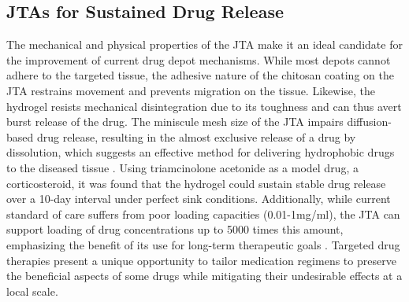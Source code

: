 \subsection{JTAs for Sustained Drug Release}
The mechanical and physical properties of the JTA make it an ideal candidate for the improvement of current drug depot mechanisms. While most depots cannot adhere to the targeted tissue, the adhesive nature of the chitosan coating on the JTA restrains movement and prevents migration on the tissue. Likewise, the hydrogel resists mechanical disintegration due to its toughness and can thus avert burst release of the drug. The miniscule mesh size of the JTA impairs diffusion-based drug release, resulting in the almost exclusive release of a drug by dissolution, which suggests an effective method for delivering hydrophobic drugs to the diseased tissue \autocite{jta_poc}. Using triamcinolone acetonide as a model drug, a corticosteroid, it was found that the hydrogel could sustain stable drug release over a 10-day interval under perfect sink conditions. Additionally, while current standard of care suffers from poor loading capacities (0.01-1mg/ml), the JTA can support loading of drug concentrations up to 5000 times this amount, emphasizing the benefit of its use for long-term therapeutic goals \autocite{jta_poc}. Targeted drug therapies present a unique opportunity to tailor medication regimens to preserve the beneficial aspects of some drugs while mitigating their undesirable effects at a local scale.

\autocite{jta_poc}
\autocite{mooney_drug}
\autocite{janus_interface}
\autocite{nsaids}